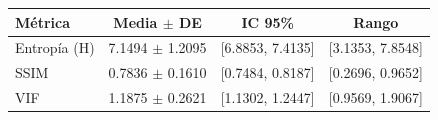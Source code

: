 \begin{tabular}{lccc}
\hline
\textbf{Métrica} & \textbf{Media $\pm$ DE} & \textbf{IC 95\%} & \textbf{Rango} \\
\hline
Entropía (H) & 7.1494 $\pm$ 1.2095 & [6.8853, 7.4135] & [3.1353, 7.8548] \\
SSIM & 0.7836 $\pm$ 0.1610 & [0.7484, 0.8187] & [0.2696, 0.9652] \\
VIF & 1.1875 $\pm$ 0.2621 & [1.1302, 1.2447] & [0.9569, 1.9067] \\
\hline
\end{tabular}